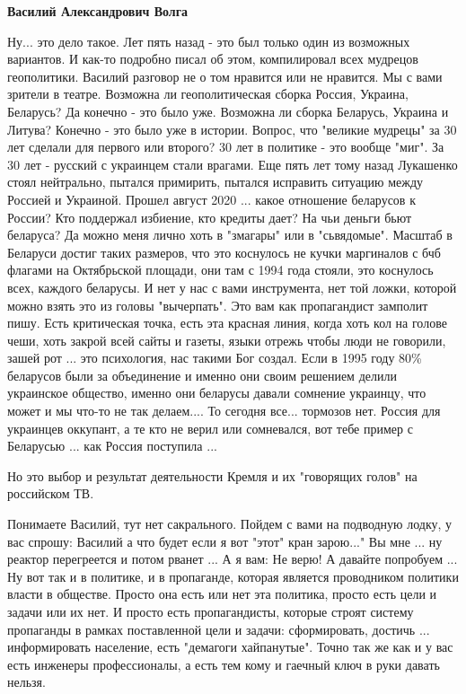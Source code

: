 \begin{itemize}
\begin{itemize}
\textbf{Василий Александрович Волга} 

Ну... это дело такое. Лет пять назад - это был только один из возможных
вариантов. И как-то подробно писал об этом, компилировал всех мудрецов
геополитики. Василий разговор не о том нравится или не нравится. Мы с вами
зрители в театре. Возможна ли геополитическая сборка Россия, Украина, Беларусь?
Да конечно - это было уже. Возможна ли сборка Беларусь, Украина и Литува?
Конечно - это было уже в истории. Вопрос, что "великие мудрецы" за 30 лет
сделали для первого или второго? 30 лет в политике - это вообще "миг". За 30
лет - русский с украинцем стали врагами. Еще пять лет тому назад Лукашенко
стоял нейтрально, пытался примирить, пытался исправить ситуацию между Россией и
Украиной. Прошел август 2020 ... какое отношение беларусов к России? Кто
поддержал избиение, кто кредиты дает? На чьи деньги бьют беларуса? Да можно
меня лично хоть в "змагары" или в "сьвядомые". Масштаб в Беларуси достиг таких
размеров, что это коснулось не кучки маргиналов с бчб флагами на Октябрьской
площади, они там с 1994 года стояли, это коснулось всех, каждого беларусы. И
нет у нас с вами инструмента, нет той ложки, которой можно взять это из головы
"вычерпать". Это вам как пропагандист замполит пишу. Есть критическая точка,
есть эта красная линия, когда хоть кол на голове чеши, хоть закрой всей сайты и
газеты, языки отрежь чтобы люди не говорили, зашей рот ... это психология, нас
такими Бог создал. Если в 1995 году 80\% беларусов были за объединение и именно
они своим решением делили украинское общество, именно они беларусы давали
сомнение украинцу, что может и мы что-то не так делаем.... То сегодня все...
тормозов нет. Россия для украинцев оккупант, а те кто не верил или сомневался,
вот тебе пример с Беларусью ... как Россия поступила ...

Но это выбор и результат деятельности Кремля и их "говорящих голов" на российском ТВ.

Понимаете Василий, тут нет сакрального. Пойдем с вами на подводную лодку, у вас
спрошу: Василий а что будет если я вот "этот" кран зарою..." Вы мне ... ну
реактор перегреется и потом рванет ... А я вам: Не верю! А давайте попробуем
... Ну вот так и в политике, и в пропаганде, которая является проводником
политики власти в обществе. Просто она есть или нет эта политика, просто есть
цели и задачи или их нет. И просто есть пропагандисты, которые строят систему
пропаганды в рамках поставленной цели и задачи: сформировать, достичь ...
информировать население, есть "демагоги хайпанутые". Точно так же как и у вас
есть инженеры профессионалы, а есть тем кому и гаечный ключ в руки давать
нельзя.


\end{itemize}
\end{itemize}
